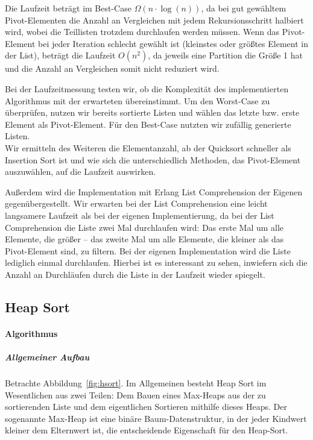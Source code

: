 \documentclass[11pt]{article}
\begin{document}
    Die Laufzeit beträgt im Best-Case \(\Omega (n \cdot \log(n))\), da bei
    gut gewähltem Pivot-Elementen die Anzahl an Vergleichen mit jedem
    Rekursionsschritt halbiert wird, wobei die Teillisten trotzdem durchlaufen
    werden müssen.
    Wenn das Pivot-Element bei jeder Iteration schlecht gewählt ist (kleinstes
    oder größtes Element in der List), beträgt die Laufzeit \(O(n^2)\), da
    jeweils eine Partition die Größe 1 hat und die Anzahl an Vergleichen
    somit nicht reduziert wird.

    Bei der Laufzeitmessung testen wir, ob die Komplexität des implementierten
    Algorithmus mit der erwarteten übereinstimmt.
    Um den Worst-Case zu überprüfen, nutzen wir bereits sortierte Listen und
    wählen das letzte bzw. erste Element als Pivot-Element.
    Für den Best-Case nutzten wir zufällig generierte Listen.\\

    Wir ermitteln des Weiteren die Elementanzahl, ab der Quicksort schneller
    als Insertion Sort ist und wie sich die unterschiedlich Methoden, das
    Pivot-Element auszuwählen, auf die Laufzeit auswirken.

    Außerdem wird die Implementation mit Erlang List Comprehension der
    Eigenen gegenübergestellt.
    Wir erwarten bei der List Comprehension eine leicht langsamere Laufzeit als
    bei der eigenen Implementierung, da bei der List Comprehension die Liste
    zwei Mal durchlaufen wird:
    Das erste Mal um alle Elemente, die größer -- das zweite Mal
    um alle Elemente, die kleiner als das Pivot-Element sind, zu filtern.
    Bei der eigenen Implementation wird die Liste lediglich einmal
    durchlaufen.
    Hierbei ist es interessant zu sehen, inwiefern sich die Anzahl an
    Durchläufen durch die Liste in der Laufzeit wieder spiegelt.


    \subsection{Heap Sort}\label{subsec:heap-sort}

    \paragraph{Algorithmus}\label{subsubsec:halgorithmus}

    \subparagraph{Allgemeiner Aufbau}
    Betrachte Abbildung~\ref{fig:hsort}.
    Im Allgemeinen besteht Heap Sort im Wesentlichen aus zwei Teilen:
    Dem Bauen eines Max-Heaps aus der zu sortierenden Liste und dem
    eigentlichen Sortieren mithilfe dieses Heaps.
    Der sogenannte Max-Heap ist eine binäre Baum-Datenstruktur, in der jeder
    Kindwert kleiner dem Elternwert ist, die entscheidende Eigenschaft für
    den Heap-Sort.
\end{document}
